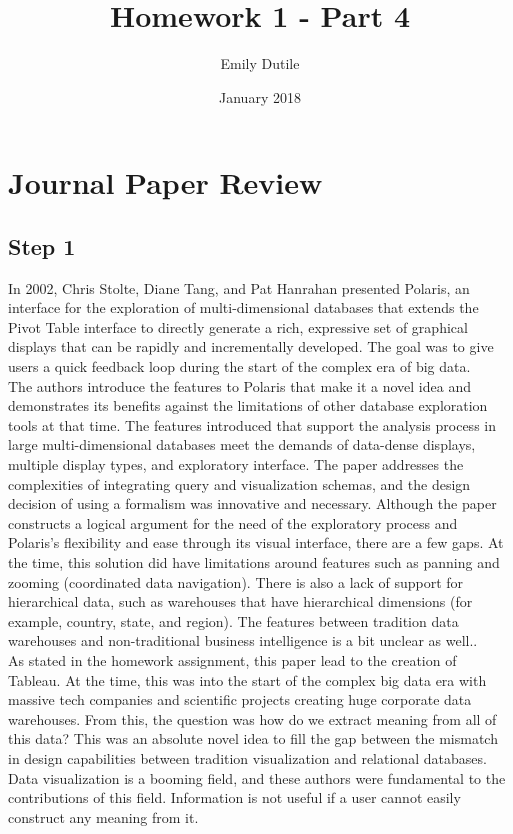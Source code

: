 \documentclass{neu_handout}
\title{Homework 1 - Part 4}
\author{Emily Dutile}
\date{January 2018}
\begin{document}
\section*{Journal Paper Review}

\subsection*{Step 1}

In 2002, Chris Stolte, Diane Tang, and Pat Hanrahan presented Polaris, an interface for the exploration of multi-dimensional databases that extends the Pivot Table interface to directly generate a rich, expressive set of graphical displays that can be rapidly and incrementally developed. The goal was to give users a quick feedback loop during the start of the complex era of big data. \\

The authors introduce the features to Polaris that make it a novel idea and demonstrates its benefits against the limitations of other database exploration tools at that time. The features introduced that support the analysis process in large multi-dimensional databases meet the demands of data-dense displays, multiple display types, and exploratory interface. The paper addresses the complexities of integrating query and visualization schemas, and the design decision of using a formalism was innovative and necessary. Although the paper constructs a logical argument for the need of the exploratory process and Polaris's flexibility and ease through its visual interface, there are a few gaps. At the time, this solution did have limitations around features such as panning and zooming (coordinated data navigation). There is also a lack of support for hierarchical data, such as warehouses that have hierarchical dimensions (for example, country, state, and region). The features between tradition data warehouses and non-traditional business intelligence is a bit unclear as well..  \\

As stated in the homework assignment, this paper lead to the creation of Tableau. At the time, this was into the start of the complex big data era with massive tech companies and scientific projects creating huge corporate data warehouses. From this, the question was how do we extract meaning from all of this data? This was an absolute novel idea to fill the gap between the mismatch in design capabilities between tradition visualization and relational databases. Data visualization is a booming field, and these authors were fundamental to the contributions of this field. Information is not useful if a user cannot easily construct any meaning from it.
\end{document}
